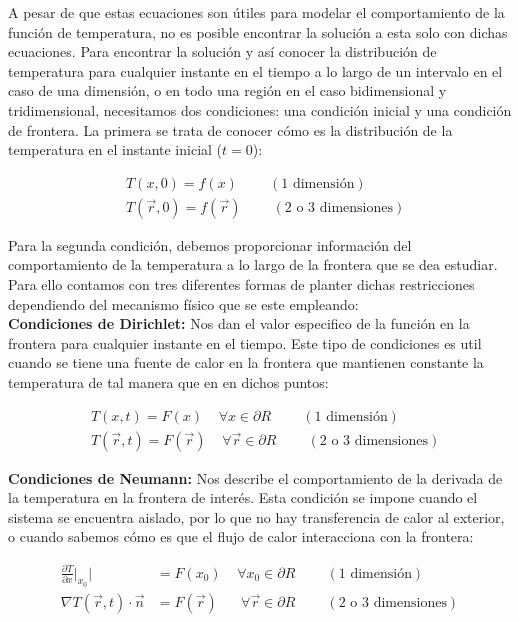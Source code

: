 \documentclass[12pt]{article}
\begin{document}
A pesar de que estas ecuaciones son útiles para modelar el comportamiento de la función de temperatura, no es posible encontrar la solución a esta solo con dichas ecuaciones. Para encontrar la solución y así conocer la distribución de temperatura para cualquier instante en el tiempo a lo largo de un intervalo en el caso de una dimensión, o en todo una región en el caso bidimensional y tridimensional, necesitamos dos condiciones: una condición inicial y una condición de frontera. La primera se trata de conocer cómo es la distribución de la temperatura en el instante inicial ($t=0$):

\begin{align*}
    & T(x,0) = f(x) \;\;\;\;\;\;\;\; (\text{1 dimensión}) \\
    &T(\vec{r},0) = f(\vec{r}) \;\;\;\;\;\;\;\; (\text{2 o 3 dimensiones})
\end{align*}

Para la segunda condición, debemos proporcionar información del comportamiento de la temperatura a lo largo de la frontera que se dea estudiar. Para ello contamos con tres  diferentes formas de planter dichas restricciones dependiendo del mecanismo físico que se este empleando: \\

\textbf{Condiciones de Dirichlet: }Nos dan el valor especifico de la función en la frontera para cualquier instante en el tiempo. Este tipo de condiciones es util cuando se tiene una fuente de calor en la frontera que mantienen constante la temperatura de tal manera que en en dichos puntos:

\begin{align*}
    &T(x,t) = F(x) \;\;\;\; \forall x \in \partial R \;\;\;\;\;\;\;\; (\text{1 dimensión})\\
    &T(\vec{r},t) = F(\vec{r}) \;\;\;\; \forall \vec{r} \in \partial R \;\;\;\;\;\;\;\; (\text{2 o 3 dimensiones})
\end{align*}

\textbf{Condiciones de Neumann: }Nos describe el comportamiento de la derivada de la temperatura en la frontera de interés. Esta condición se impone cuando el sistema se encuentra aislado, por lo que no hay transferencia de calor al exterior, o cuando sabemos cómo es que el flujo de calor interacciona con la frontera:

\begin{align*}
    \frac{\partial T}{\partial x} \Big|_{x_0}| &= F(x_0) \;\;\;\; \forall x_0 \in \partial R \;\;\;\;\;\;\;\; (\text{1 dimensión})\\
    \nabla T(\vec{r},t)\cdot \vec{n} &= F(\vec{r}) \;\;\;\;\;\; \forall \vec{r} \in \partial R \;\;\;\;\;\;\;\; (\text{2 o 3 dimensiones})
\end{align*}
\end{document}
